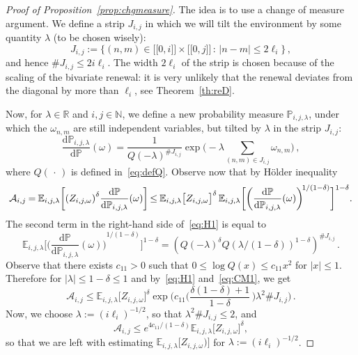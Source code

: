 \documentclass[AHL,Unicode,longabstracts]{cedram}
\newcommand{\llbracket}{\mathopen{[\![}}
\newcommand{\rrbracket}{\mathclose{]\!]}}
\newcommand{\gd}{\delta}
\newcommand{\dd}{\mathrm{d}}
\newcommand{\cA}{\ensuremath{\mathcal{A}}}
\newcommand{\bbE}{\ensuremath{\mathbb{E}}}
\newcommand{\bbN}{\ensuremath{\mathbb{N}}}
\newcommand{\bbP}{\ensuremath{\mathbb{P}}}
\newcommand{\bbR}{\ensuremath{\mathbb{R}}}
\newcommand*{\mk}{\mkern -1mu}
\newcommand*{\Mk}{\mkern -2mu}
\begin{document}
\begin{proof}[Proof of Proposition~\ref{prop:chgmeasure}]
The idea is to use a change of measure argument. We define a strip $J_{i,j}$ in which we will tilt the environment by some quantity $\lambda$ (to be chosen wisely):
\begin{equation}
J_{i,j} := \Big\{ (n,m) \in \llbracket 0, i \rrbracket \times \llbracket 0, j \rrbracket\,:\,|n-m| \leq 2 \ell_i \Big\}\,,
\end{equation}
and hence $\# J_{i,j} \leq 2 i \ell_i $. The width $2\ell_i$ of the strip is chosen because of the scaling of the bivariate renewal: it is very unlikely that the renewal deviates from the diagonal by more than $\ell_i$, see Theorem~\ref{th:reD}.

Now, for $\lambda\in\bbR$ and $i,j\in\bbN$, we define a new probability measure $\bbP_{i,j,\lambda}$, under which the $\omega_{n,m}$ are still independent variables, but tilted by $\lambda$ in the strip $J_{i,j}$:
\begin{equation}\label{eq:newmeasure}
\frac{\dd \bbP_{i,j,\lambda}}{\dd \bbP} (\omega) = \frac{1}{Q(-\lambda)^{ \# J_{i,j}}} \exp \Big(- \lambda \sum_{(n,m) \in J_{i,j}} \omega_{n,m} \Big)\,,
\end{equation}
where $Q({\,\cdot\,})$ is defined in~\eqref{eq:defQ}. Observe now that by Hölder inequality
\begin{equation}\label{eq:H1}
\!\!\cA_{i,j} \mk=\mk
\bbE_{i,j,\lambda} \biggl[{(Z_{i,j,\omega})}^\delta \frac{\dd\bbP}{\dd\bbP_{i,j,\lambda}} (\omega) \biggr] \Mk\le\mk \bbE_{i,j,\lambda}\big[Z_{i,j,\omega} \big]^{\gd}\,
\bbE_{i,j,\lambda} \bigg[{\bigg(\frac{\dd\bbP}{\dd\bbP_{i,j,\lambda}}(\omega) \bigg) }^{\!1/(1-\delta)} \bigg]^{1-\delta}.\!\!
\end{equation}
The second term in the right-hand side of~\eqref{eq:H1} is equal to
\begin{equation}\label{eq:CM1}
\bbE_{i,j,\lambda} \bigg[{\bigg(\frac{\dd\bbP}{\dd\bbP_{i,j,\lambda}}(\omega) \bigg)}^{1/(1-\delta)} \bigg]^{1-\delta} = {\left(Q(-\lambda)^{\delta} Q (\lambda /(1-\delta))^{1-\delta}\right)}^{\# J_{i,j}}\,.
\end{equation}
Observe that there exists $c_{11} >0$ such that $0 \le \log Q(x) \le c_{11} x^2$ for $\vert x \vert \le 1$. Therefore for $\vert \lambda \vert \le 1-\delta \leq 1$ and by~\eqref{eq:H1} and~\eqref{eq:CM1}, we get
\begin{equation}
\cA_{i,j}\le \bbE_{i,j,\lambda}\big[Z_{i,j,\omega} \big]^{\gd} \exp \biggl(c_{11} \biggl(\frac{\gd(1-\gd)+1}{1-\delta}\,\biggr) \lambda^2 \# J_{i,j} \biggr)\,.
\end{equation}
Now, we choose $\lambda:= (i\ell_i)^{-1/2}$, so that $\lambda^2 \# J_{i,j} \leq 2$, and
\begin{equation}\label{eq:afterHolder}
\cA_{i,j} \leq e^{4c_{11}/(1-\gd)} \bbE_{i,j,\lambda}\big[Z_{i,j,\omega} \big]^{\gd},
\end{equation}
so that we are left with estimating $\bbE_{i,j,\lambda}\big[Z_{i,j,\omega}) \big]$ for $\lambda:= (i\ell_i)^{-1/2}$.



\end{proof}
\end{document}
